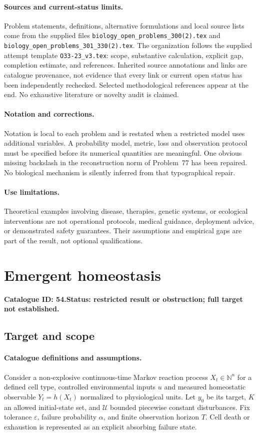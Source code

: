 \documentclass[11pt]{article}
\newcommand{\N}{\mathbb N}
\providecommand{\N}{\mathbb N}
\begin{document}
\paragraph{Sources and current-status limits.}
Problem statements, definitions, alternative formulations and local source lists
come from the supplied files
\texttt{biology\_open\_problems\_300(2).tex} and
\texttt{biology\_open\_problems\_301\_330(2).tex}.
The organization follows the supplied attempt template
\texttt{O33-23\_v3.tex}: scope, substantive calculation, explicit gap,
completion estimate, and references. Inherited source annotations and links are
catalogue provenance, not evidence that every link or current open status has
been independently rechecked. Selected methodological references appear at the
end. No exhaustive literature or novelty audit is claimed.

\paragraph{Notation and corrections.}
Notation is local to each problem and is restated when a restricted model uses
additional variables. A probability model, metric, loss and observation protocol
must be specified before its numerical quantities are meaningful. One obvious
missing backslash in the reconstruction norm of Problem~77 has been repaired.
No biological mechanism is silently inferred from that typographical repair.

\paragraph{Use limitations.}
Theoretical examples involving disease, therapies, genetic systems, or ecological
interventions are not operational protocols, medical guidance, deployment advice,
or demonstrated safety guarantees. Their assumptions and empirical gaps are part
of the result, not optional qualifications.

\setcounter{section}{53}
\section{Emergent homeostasis}
\label{prob:054}
\noindent\textbf{Catalogue ID: 54.}\quad \textbf{Status: restricted result or obstruction; full target not established.}
\subsection{Target and scope}
\paragraph{Catalogue definitions and assumptions.}
Consider a non-explosive continuous-time Markov reaction process $X_t\in\N^n$ for a defined cell type, controlled environmental inputs $u$ and measured homeostatic observable $Y_t=h(X_t)$ normalized to physiological units. Let $y_0$ be its target, $K$ an allowed initial-state set, and $\mathcal U$ bounded piecewise constant disturbances. Fix tolerance $\varepsilon$, failure probability $\alpha$, and finite observation horizon $T$. Cell death or exhaustion is represented as an explicit absorbing failure state.
\end{document}
